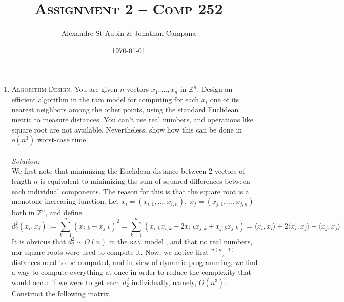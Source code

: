 \documentclass[12pt]{article}
\title{\textsc{Assignment 2 -- Comp 252}}
\author{Alexandre St-Aubin \& Jonathan Campana}
\date{\today}
\theoremstyle{definition}
\theoremstyle{remark}
\newcommand\sol{%
  \\ 
  \\
  \textit{Solution:}\\%
}
\begin{document}
\maketitle 
\begin{enumerate}
  \item \textsc{Algorithm Design.}
You are given $n$ vectors $x_1,... , x_n$ in $\mathbb{Z}^n$. Design an efficient algorithm in the ram model for computing for each $x_i$ one of its nearest
neighbors among the other points, using the standard Euclidean metric to measure distances. You can’t
use real numbers, and operations like square root are not available. Nevertheless, show how this can be
done in $o(n^3)$ worst-case time.
\sol   
   We first note that minimizing the Euclidean distance between 2 vectors of length $n$ is equivalent to minimizing the sum of squared differences between each individual components. The reason for this is that the square root is a monotone increasing function. Let $x_i = (x_{i,1}, ..., x_{i,n}), \; x_j = (x_{j,1}, ..., x_{j,n})$ both in $\mathbb{Z}^n$, and define 
  \begin{equation}d_2^2(x_i, x_j) := \sum_{k=1}^n (x_{i,k} -x_{j,k})^2 = \sum_{k=1}^n(x_{i,k}x_{i,k} - 2 x_{i,k} x_{j,k} + x_{j,k}x_{j,k}) = \langle x_i, x_i  \rangle + 2\langle x_i, x_j  \rangle  + \langle x_j, x_j  \rangle \end{equation}
  It is obvious that $d_2^2 \sim O(n)$ in the \textsc{ram} model , and that no real numbers, nor square roots were used to compute it. Now, we notice that $\frac{n(n-1)}{2}$ distances need to be computed, and in view of dynamic programming, we find a way to compute everything at once in order to reduce the complexity that would occur if we were to get each $d_2^2$ individually, namely, $O(n^3)$. Construct the following matrix, 


\end{enumerate}
\end{document}
